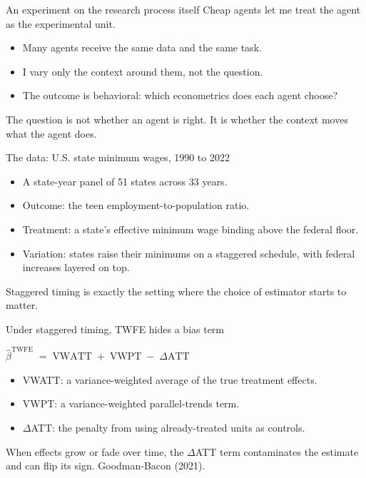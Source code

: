 \documentclass[aspectratio=169,11pt]{beamer}
\begin{document}
\begin{frame}{An experiment on the research process itself}
Cheap agents let me treat the agent as the experimental unit.
\vspace{0.3cm}
\begin{itemize}\setlength\itemsep{0.3em}
    \item Many agents receive the same data and the same task.
    \item I vary only the context around them, not the question.
    \item The outcome is behavioral: which econometrics does each agent choose?
\end{itemize}
\vspace{0.4cm}
\alert{The question is not whether an agent is right. It is whether the context moves what the agent does.}
\end{frame}

\begin{frame}{The data: U.S. state minimum wages, 1990 to 2022}
\begin{itemize}\setlength\itemsep{0.3em}
    \item A state-year panel of 51 states across 33 years.
    \item Outcome: the teen employment-to-population ratio.
    \item Treatment: a state's effective minimum wage binding above the federal floor.
    \item Variation: states raise their minimums on a staggered schedule, with federal increases layered on top.
\end{itemize}
\vspace{0.4cm}
\alert{Staggered timing is exactly the setting where the choice of estimator starts to matter.}
\end{frame}

\begin{frame}{Under staggered timing, TWFE hides a bias term}
\vspace{0.2cm}
\begin{center}
{\large $\hat{\beta}^{\text{TWFE}} \;=\; \text{VWATT} \;+\; \text{VWPT} \;-\; \Delta\text{ATT}$}
\end{center}
\vspace{0.3cm}
\begin{itemize}\setlength\itemsep{0.3em}
    \item VWATT: a variance-weighted average of the true treatment effects.
    \item VWPT: a variance-weighted parallel-trends term.
    \item $\Delta$ATT: the penalty from using already-treated units as controls.
\end{itemize}
\vspace{0.35cm}
\alert{When effects grow or fade over time, the $\Delta$ATT term contaminates the estimate and can flip its sign.}
\vspace{0.1cm}
{\scriptsize\color{warmgray}Goodman-Bacon (2021).}
\end{frame}
\end{document}
